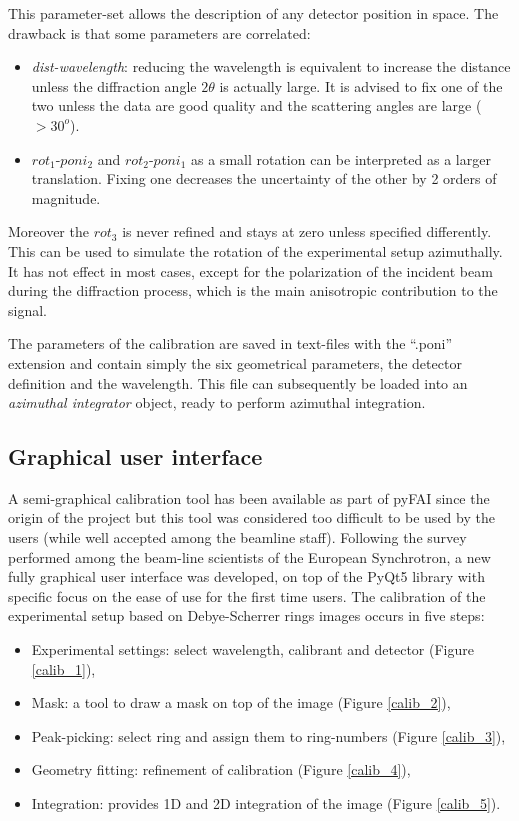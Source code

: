 \documentclass[preprint, pdf]{iucr}              %
\begin{document}
This parameter-set allows the description of any detector position in space.
The drawback is that some parameters are correlated: 
\begin{itemize}
  \item \textit{dist-wavelength}: reducing the wavelength is equivalent to
  increase the distance unless the diffraction angle $2\theta$ is actually
  large. It is advised to fix one of the two unless the data are good
  quality and the scattering angles are large ($>30^o$).
  \item $rot_1$-$poni_2$ and $rot_2$-$poni_1$ as a small rotation can be
  interpreted as a larger translation. Fixing one decreases the uncertainty of
  the other by 2 orders of magnitude.
\end{itemize}

Moreover the $rot_3$ is never refined and stays at zero unless specified
differently.  This can be used to simulate the rotation of the
experimental setup azimuthally. 
It has not effect in most cases, except for the
polarization of the incident beam during the diffraction process, which is the
main anisotropic contribution to the signal.

The parameters of the calibration are saved in text-files with the ``.poni''
extension and contain simply the six geometrical parameters, the detector
definition and the wavelength.
This file can subsequently be loaded into an \textit{azimuthal integrator}
object, ready to perform azimuthal integration.

\subsection{Graphical user interface}

A semi-graphical calibration tool has been available as part of pyFAI
\cite{fv5028} since the origin of the project but this tool was considered too
difficult to be used by the users (while well accepted among the beamline
staff).
Following the survey performed among the beam-line scientists of the European
Synchrotron, a new fully graphical user interface was developed, on top of 
the PyQt5 library \cite{pyqt} with specific focus on the ease of use for the
first time users.
The calibration of the experimental setup based on Debye-Scherrer rings images 
occurs in five steps:
\begin{itemize}
  \item Experimental settings: select wavelength, calibrant and detector (Figure
  \ref{calib_1}),
  \item Mask: a tool to draw a mask on top of the image (Figure
  \ref{calib_2}),
  \item Peak-picking: select ring and assign them to ring-numbers (Figure
  \ref{calib_3}),
  \item Geometry fitting: refinement of calibration (Figure
  \ref{calib_4}), 
  \item Integration: provides 1D and 2D integration of the image (Figure
  \ref{calib_5}). 
\end{itemize}
\end{document}
